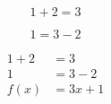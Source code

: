 \documentclass{article}
\begin{document}
\begin{equation*}
  1 + 2 = 3 
\end{equation*}

\begin{equation*}
  1 = 3 - 2
\end{equation*}

\begin{align*}
   1 + 2 &= 3\\
 	 1 &= 3 - 2\\
       f(x)&=3x +1
\end{align*}
\end{document}
